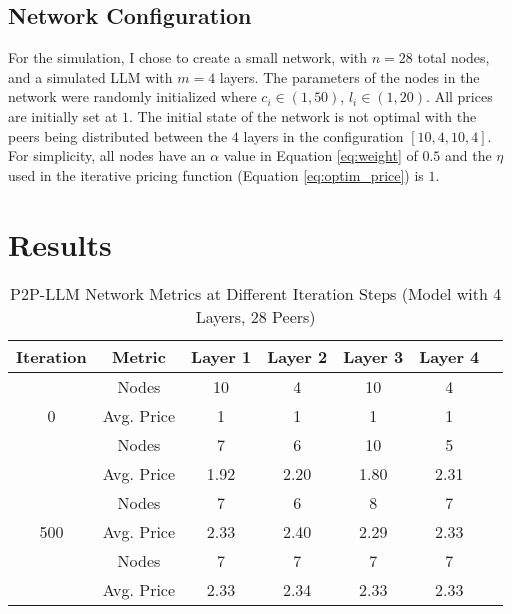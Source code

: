 \documentclass[preprint,twoside,11pt]{article}
\begin{document}
\subsection{Network Configuration}

For the simulation, I chose to create a small network, with $n = 28$ total nodes, and a simulated LLM with $m = 4$ layers.
The parameters of the nodes in the network were randomly initialized
where $c_i \in (1,50)$, $l_i \in (1,20)$. All prices are initially set at $1$. The initial state of the network is not optimal with the peers being distributed between the $4$ layers in the configuration $[10, 4, 10, 4]$.
For simplicity, all nodes have an $\alpha$ value in Equation \ref{eq:weight} of $0.5$ and the $\eta$ used in the iterative pricing function (Equation \ref{eq:optim_price}) is $1$.

\section{Results}

\begin{table}[h]
	\centering
	\caption{P2P-LLM Network Metrics at Different Iteration Steps (Model with 4 Layers, 28 Peers)}
	\label{tab:network-metrics}
	\begin{tabular}{ccccccc}
		\toprule
		\textbf{Iteration} & \textbf{Metric} & \textbf{Layer 1} & \textbf{Layer 2} & \textbf{Layer 3} & \textbf{Layer 4} \\
		\midrule
		\multirow{3}{*}{0}
		                   & Nodes           & 10               & 4                & 10               & 4                \\
		                   & Avg. Price      & 1                & 1                & 1                & 1                \\
		\midrule
		\multirow{3}{*}{100}
		                   & Nodes           & 7                & 6                & 10               & 5                \\
		                   & Avg. Price      & 1.92             & 2.20             & 1.80             & 2.31             \\
		\midrule
		\multirow{3}{*}{500}
		                   & Nodes           & 7                & 6                & 8                & 7                \\
		                   & Avg. Price      & 2.33             & 2.40             & 2.29             & 2.33             \\
		\midrule
		\multirow{3}{*}{1000}
		                   & Nodes           & 7                & 7                & 7                & 7                \\
		                   & Avg. Price      & 2.33             & 2.34             & 2.33             & 2.33             \\
		\bottomrule
	\end{tabular}
\end{table}
\end{document}

